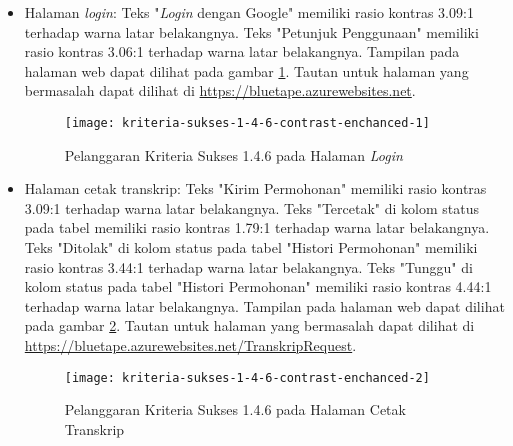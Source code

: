 \begin{itemize}
    \item Halaman \textit{login}: Teks "\textit{Login} dengan Google" memiliki rasio kontras 3.09:1 terhadap warna latar belakangnya. Teks "Petunjuk Penggunaan" memiliki rasio kontras 3.06:1 terhadap warna latar belakangnya. Tampilan pada halaman web dapat dilihat pada gambar \ref{fig:1.4.6_contrast_enchanced_1}. Tautan untuk halaman yang bermasalah dapat dilihat di \url{https://bluetape.azurewebsites.net}.
    \begin{figure}[H]
        \centering  
        \texttt{[image: kriteria-sukses-1-4-6-contrast-enchanced-1]}  
        \caption[Pelanggaran Kriteria Sukses 1.4.6 pada Halaman \textit{Login}]{Pelanggaran Kriteria Sukses 1.4.6 pada Halaman \textit{Login}}
        \label{fig:1.4.6_contrast_enchanced_1}  
    \end{figure} 

    \item Halaman cetak transkrip: Teks "Kirim Permohonan" memiliki rasio kontras 3.09:1 terhadap warna latar belakangnya. Teks "Tercetak" di kolom status pada tabel memiliki rasio kontras 1.79:1 terhadap warna latar belakangnya. Teks "Ditolak" di kolom status pada tabel "Histori Permohonan" memiliki rasio kontras 3.44:1 terhadap warna latar belakangnya. Teks "Tunggu" di kolom status pada tabel "Histori Permohonan" memiliki rasio kontras 4.44:1 terhadap warna latar belakangnya. Tampilan pada halaman web dapat dilihat pada gambar \ref{fig:1.4.6_contrast_enchanced_2}. Tautan untuk halaman yang bermasalah dapat dilihat di \url{https://bluetape.azurewebsites.net/TranskripRequest}.
    \begin{figure}[H]
        \centering  
        \texttt{[image: kriteria-sukses-1-4-6-contrast-enchanced-2]}  
        \caption[Pelanggaran Kriteria Sukses 1.4.6 pada Halaman Cetak Transkrip]{Pelanggaran Kriteria Sukses 1.4.6 pada Halaman Cetak Transkrip}
        \label{fig:1.4.6_contrast_enchanced_2}  
    \end{figure} 
    

\end{itemize}
